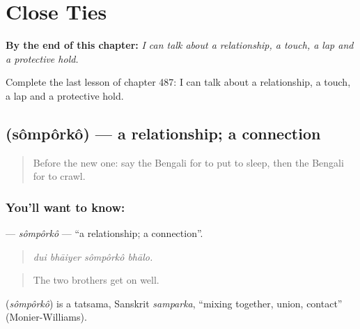 
\chapter{Close Ties}
\label{ch:bn-close-ties}

\begin{chapteropening}
\textbf{By the end of this chapter:} \emph{I can talk about a relationship, a touch, a lap and a protective hold.}

Complete the last lesson of chapter 487: I can talk about a relationship, a touch, a lap and a protective hold.
\end{chapteropening}

\section[\texorpdfstring{\bn{সম্পর্ক} (sômpôrkô)}{সম্পর্ক (sômpôrkô)}]{ (sômpôrkô) — a relationship; a connection}

\label{lesson:BN-C487-somporko}



\begin{quote}
Before the new one: say the Bengali for to put to sleep, then the Bengali for to crawl.
\end{quote}

\subsection*{You'll want to know: }
\textbf{} — \emph{sômpôrkô} — \textquotedblleft{}a relationship; a connection\textquotedblright{}.

\begin{quote}
   
\end{quote}

\begin{quote}
\emph{dui bhāiyer sômpôrkô bhālo.}
\end{quote}

\begin{quote}
The two brothers get on well.
\end{quote}

\begin{cousinweb}
\textbf{} (\emph{sômpôrkô}) is a tatsama, Sanskrit \emph{samparka}, \textquotedblleft{}mixing together, union, contact\textquotedblright{} (Monier-Williams).
\end{cousinweb}

